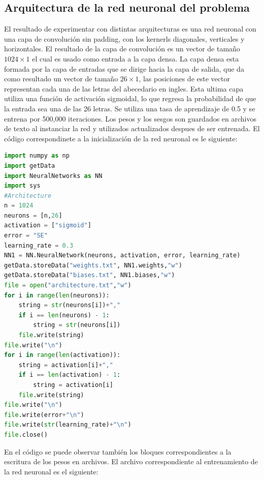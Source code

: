 \documentclass{article}
\begin{document}
\subsection{Arquitectura de la red neuronal del problema}
El resultado de experimentar con distintas arquitecturas es una red neuronal con una capa de convolución sin padding, con los kernerls diagonales, verticales y horizontales. 
El resultado de la capa de convolución es un vector de tamaño $1024\times1$ el cual es usado como entrada a la capa densa. La capa densa esta formada por la capa de entradas que se dirige hacia la capa de salida, que da como resultado un
vector de tamaño $26\times1$, las posiciones de este vector representan cada una de las letras del abecedario en ingles. Esta ultima capa utiliza una función de activación sigmoidal, lo que regresa la probabilidad de que la entrada sea una de las 26 letras.
Se utiliza una tasa de aprendizaje de 0.5 y se entrena por 500,000 iteraciones. Los pesos y los sesgos son guardados en archivos de texto al instanciar la red y utilizados actualizados despues de ser entrenada. El código correspondinete a la inicialización de la red neuronal es le siguiente:
\begin{lstlisting}[language=python]
import numpy as np
import getData
import NeuralNetworks as NN
import sys
#Architecture
n = 1024
neurons = [n,26]
activation = ["sigmoid"]
error = "SE"
learning_rate = 0.3
NN1 = NN.NeuralNetwork(neurons, activation, error, learning_rate)
getData.storeData("weights.txt", NN1.weights,"w")
getData.storeData("biases.txt", NN1.biases,"w")
file = open("architecture.txt","w")
for i in range(len(neurons)):
    string = str(neurons[i])+","
    if i == len(neurons) - 1:
        string = str(neurons[i])
    file.write(string)
file.write("\n")
for i in range(len(activation)):
    string = activation[i]+","
    if i == len(activation) - 1:
        string = activation[i]
    file.write(string)
file.write("\n")
file.write(error+"\n")
file.write(str(learning_rate)+"\n")
file.close()
\end{lstlisting}
En el código se puede observar también los bloques correspondientes a la escritura de los pesos en archivos.
El archivo correspondiente al entrenamiento de la red neuronal es el siguiente:
\end{document}
